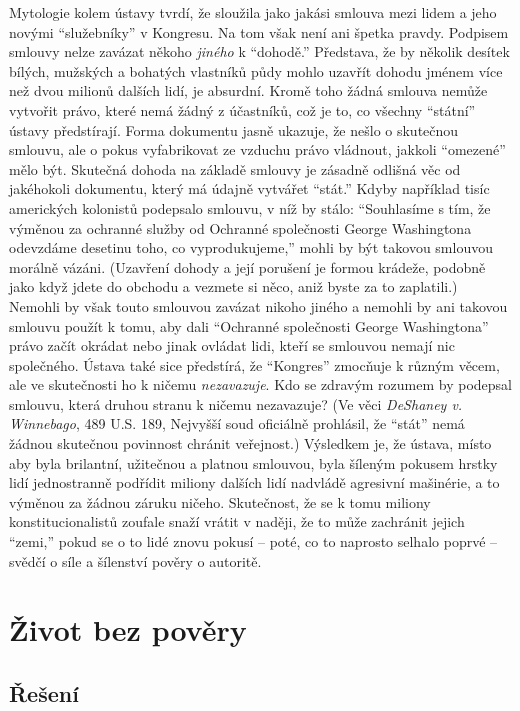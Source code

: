 \documentclass{book}
\begin{document}
Mytologie kolem ústavy tvrdí, že sloužila jako jakási smlouva mezi lidem a jeho novými \enquote{služebníky} v Kongresu. Na tom však není ani špetka pravdy. Podpisem smlouvy nelze zavázat někoho \emph{jiného} k \enquote{dohodě.} Představa, že by několik desítek bílých, mužských a bohatých vlastníků půdy mohlo uzavřít dohodu jménem více než dvou milionů dalších lidí, je absurdní. Kromě toho žádná smlouva nemůže vytvořit právo, které nemá žádný z účastníků, což je to, co všechny \enquote{státní} ústavy předstírají. Forma dokumentu jasně ukazuje, že nešlo o skutečnou smlouvu, ale o pokus vyfabrikovat ze vzduchu právo vládnout, jakkoli \enquote{omezené} mělo být. Skutečná dohoda na základě smlouvy je zásadně odlišná věc od jakéhokoli dokumentu, který má údajně vytvářet \enquote{stát.} Kdyby například tisíc amerických kolonistů podepsalo smlouvu, v níž by stálo: \enquote{Souhlasíme s tím, že výměnou za ochranné služby od Ochranné společnosti George Washingtona odevzdáme desetinu toho, co vyprodukujeme,} mohli by být takovou smlouvou morálně vázáni. (Uzavření dohody a její porušení je formou krádeže, podobně jako když jdete do obchodu a vezmete si něco, aniž byste za to zaplatili.) Nemohli by však touto smlouvou zavázat nikoho jiného a nemohli by ani takovou smlouvu použít k tomu, aby dali \enquote{Ochranné společnosti George Washingtona} právo začít okrádat nebo jinak ovládat lidi, kteří se smlouvou nemají nic společného. Ústava také sice předstírá, že \enquote{Kongres} zmocňuje k různým věcem, ale ve skutečnosti ho k ničemu \emph{nezavazuje}. Kdo se zdravým rozumem by podepsal smlouvu, která druhou stranu k ničemu nezavazuje? (Ve věci \emph{DeShaney v. Winnebago}, 489 U.S. 189, Nejvyšší soud oficiálně prohlásil, že \enquote{stát} nemá žádnou skutečnou povinnost chránit veřejnost.) Výsledkem je, že ústava, místo aby byla brilantní, užitečnou a platnou smlouvou, byla šíleným pokusem hrstky lidí jednostranně podřídit miliony dalších lidí nadvládě agresivní mašinérie, a to výměnou za žádnou záruku ničeho. Skutečnost, že se k tomu miliony konstitucionalistů zoufale snaží vrátit v naději, že to může zachránit jejich \enquote{zemi,} pokud se o to lidé znovu pokusí -- poté, co to naprosto selhalo poprvé -- svědčí o síle a šílenství pověry o autoritě.

\chapter{Život bez pověry}

\section{Řešení}
\end{document}
